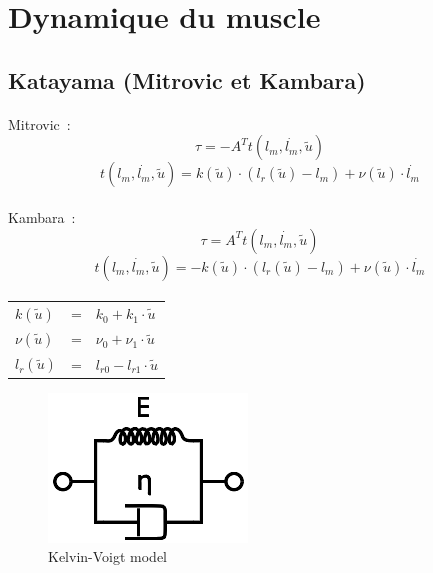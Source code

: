 \documentclass[pdftex,a4paper,11pt]{article}
\numberwithin{equation}{subsection}
\begin{document}

\section{Dynamique du muscle}

\subsection{Katayama (Mitrovic et Kambara)}

\paragraph{}
Mitrovic~:
\[ \tau = -A^T t(l_m, \dot{l_m}, \tilde{u}) \]
\[ t(l_m, \dot{l_m}, \tilde{u}) = k(\tilde{u}) \cdot (l_r(\tilde{u}) - l_m) + \nu(\tilde{u}) \cdot \dot{l_m} \]

\paragraph{}
Kambara~:
\[ \tau = A^T t(l_m, \dot{l_m}, \tilde{u}) \]
\[ t(l_m, \dot{l_m}, \tilde{u}) = -k(\tilde{u}) \cdot (l_r(\tilde{u}) - l_m) + \nu(\tilde{u}) \cdot \dot{l_m} \]

\paragraph{}
\begin{tabular}{lcl}
    $k(\tilde{u})$    & = &  $k_0 + k_1 \cdot \tilde{u}$ \\
    $\nu(\tilde{u})$  & = &  $\nu_0 + \nu_1 \cdot \tilde{u}$ \\
    $l_r(\tilde{u})$  & = &  $l_{r0} - l_{r1} \cdot \tilde{u}$ \\
\end{tabular}

\begin{figure}[h]
    \centering
    \includegraphics[width=.20\linewidth]{fig/Kelvin_Voigt_diagram}
    \caption{Kelvin-Voigt model}
\end{figure}
\end{document}
